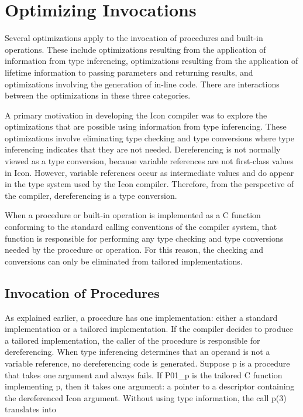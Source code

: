 \chapter{Optimizing Invocations}

Several optimizations apply to the invocation of procedures and
built-in operations. These include optimizations resulting from the
application of information from type inferencing, optimizations
resulting from the application of lifetime information to passing
parameters and returning results, and optimizations involving the
generation of in-line code. There are interactions between the
optimizations in these three categories.

A primary motivation in developing the Icon compiler was to explore
the optimizations that are possible using information from type
inferencing. These optimizations involve eliminating type checking and
type conversions where type inferencing indicates that they are not
needed. Dereferencing is not normally viewed as a type conversion,
because variable references are not first-class values in
Icon. However, variable references occur as intermediate values and do
appear in the type system used by the Icon compiler. Therefore, from
the perspective of the compiler, dereferencing is a type conversion.

When a procedure or built-in operation is implemented as a C function
conforming to the standard calling conventions of the compiler system,
that function is responsible for performing any type checking and type
conversions needed by the procedure or operation. For this reason, the
checking and conversions can only be eliminated from tailored
implementations.


\section{Invocation of Procedures}

As explained earlier, a procedure has one implementation: either a
standard implementation or a tailored implementation.  If the compiler
decides to produce a tailored implementation, the caller of the
procedure is responsible for dereferencing. When type inferencing
determines that an operand is not a variable reference, no
dereferencing code is generated. Suppose p is a procedure that takes
one argument and always fails. If P01\_p is the tailored C function
implementing p, then it takes one argument: a pointer to a descriptor
containing the dereferenced Icon argument.  Without using type
information, the call p(3) translates into

